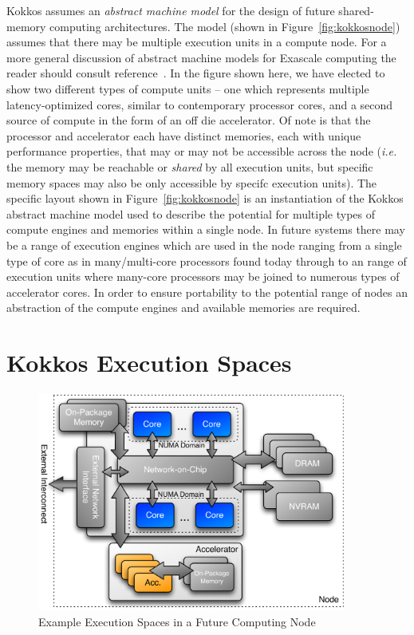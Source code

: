 Kokkos assumes an {\em abstract machine model} for the design of
future shared-memory computing architectures. The model (shown in
Figure~\ref{fig:kokkosnode}) assumes that there may be multiple
execution units in a compute node. For a more general discussion
of abstract machine models for Exascale computing the reader should
consult reference~\cite{cal_amm}. In the figure shown here,
we have elected to
show two different types of compute units -- one which represents
multiple latency-optimized cores, similar to contemporary processor
cores, and a second source of compute in the form of an off die
accelerator. Of note is that the processor and accelerator each 
have distinct memories, each with unique performance properties,
that may or may not be accessible across the node ({\em i.e.} the memory may be
reachable or {\em shared} by all execution units, but specific 
memory spaces may also be only accessible by specifc execution units). 
The specific layout shown in Figure~\ref{fig:kokkosnode} is an instantiation
of the Kokkos abstract machine model used to describe the potential
for multiple types of compute engines and memories within a single
node. In future systems there may be a range of execution engines
which are used in the node ranging from a single type of core
as in many/multi-core processors found today through to an range
of execution units where many-core processors may be joined to
numerous types of accelerator cores. In order to ensure portability
to the potential range of nodes an abstraction of the
compute engines and available memories are required.

\section{Kokkos Execution Spaces}

\begin{figure}
\begin{center}
\includegraphics[width=4in]{figures/kokkos-execution-space.pdf}
\caption{Example Execution Spaces in a Future Computing Node}
\label{fig:kokkos_execution_spaces}
\end{center}
\end{figure}

